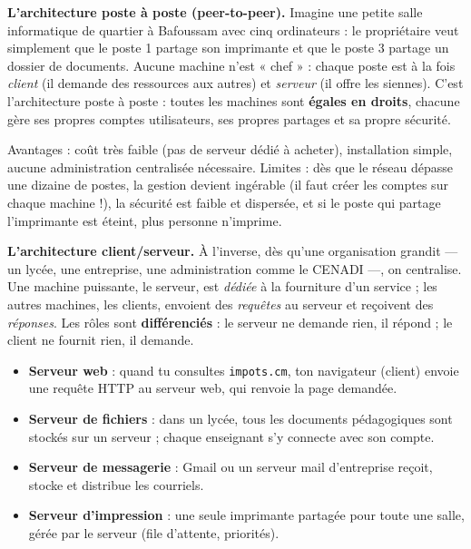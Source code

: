 \documentclass[11pt]{article}
\newcommand{\cle}[1]{{\popxbold\color{popdark}#1}}
\begin{document}
\textbf{L'architecture poste à poste (peer-to-peer).} Imagine une petite salle informatique de quartier à Bafoussam avec cinq ordinateurs : le propriétaire veut simplement que le poste 1 partage son imprimante et que le poste 3 partage un dossier de documents. Aucune machine n'est « chef » : chaque poste est à la fois \emph{client} (il demande des ressources aux autres) et \emph{serveur} (il offre les siennes). C'est l'architecture poste à poste : toutes les machines sont \textbf{égales en droits}, chacune gère ses propres comptes utilisateurs, ses propres partages et sa propre sécurité.

Avantages : coût très faible (pas de serveur dédié à acheter), installation simple, aucune administration centralisée nécessaire. Limites : dès que le réseau dépasse une dizaine de postes, la gestion devient ingérable (il faut créer les comptes sur chaque machine !), la sécurité est faible et dispersée, et si le poste qui partage l'imprimante est éteint, plus personne n'imprime.

\textbf{L'architecture client/serveur.} À l'inverse, dès qu'une organisation grandit — un lycée, une entreprise, une administration comme le CENADI —, on centralise. Une machine puissante, le \cle{serveur}, est \emph{dédiée} à la fourniture d'un service ; les autres machines, les \cle{clients}, envoient des \emph{requêtes} au serveur et reçoivent des \emph{réponses}. Les rôles sont \textbf{différenciés} : le serveur ne demande rien, il répond ; le client ne fournit rien, il demande.

\begin{exemplebox}
\begin{itemize}
\item \textbf{Serveur web} : quand tu consultes \texttt{impots.cm}, ton navigateur (client) envoie une requête HTTP au serveur web, qui renvoie la page demandée.
\item \textbf{Serveur de fichiers} : dans un lycée, tous les documents pédagogiques sont stockés sur un serveur ; chaque enseignant s'y connecte avec son compte.
\item \textbf{Serveur de messagerie} : Gmail ou un serveur mail d'entreprise reçoit, stocke et distribue les courriels.
\item \textbf{Serveur d'impression} : une seule imprimante partagée pour toute une salle, gérée par le serveur (file d'attente, priorités).
\end{itemize}
\end{exemplebox}
\end{document}
